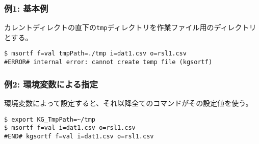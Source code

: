 \subsubsection*{例1: 基本例}

カレントディレクトの直下の\verb|tmp|ディレクトリを作業ファイル用のディレクトリとする。


\begin{Verbatim}[baselinestretch=0.7,frame=single]
$ msortf f=val tmpPath=./tmp i=dat1.csv o=rsl1.csv
#ERROR# internal error: cannot create temp file (kgsortf)
\end{Verbatim}
\subsubsection*{例2: 環境変数による指定}

環境変数によって設定すると、それ以降全てのコマンドがその設定値を使う。


\begin{Verbatim}[baselinestretch=0.7,frame=single]
$ export KG_TmpPath=~/tmp
$ msortf f=val i=dat1.csv o=rsl1.csv
#END# kgsortf f=val i=dat1.csv o=rsl1.csv
\end{Verbatim}
